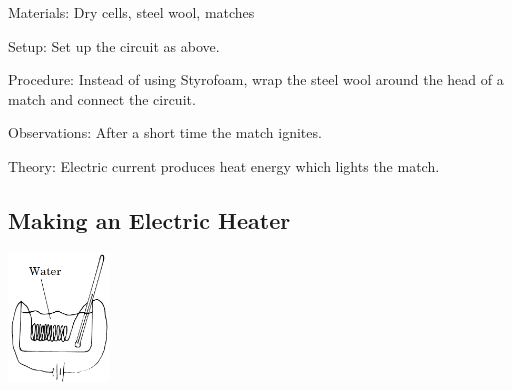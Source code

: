 \begin{multicols}{2}
\begin{description*}
\item[Materials:]{Dry cells, steel wool, matches}
\item[Setup:]{Set up the circuit as above.}
\item[Procedure:]{Instead of using Styrofoam, wrap the steel wool around the head of a match and connect the circuit.}
\item[Observations:]{After a short time the match ignites.}
\item[Theory:]{Electric current produces heat energy which lights the match.}
\end{description*}

\columnbreak

\subsection{Making an Electric Heater}

\begin{center}
\includegraphics[width=0.2\textwidth]{./img/electric-heater.png}
\end{center}


\end{multicols}
